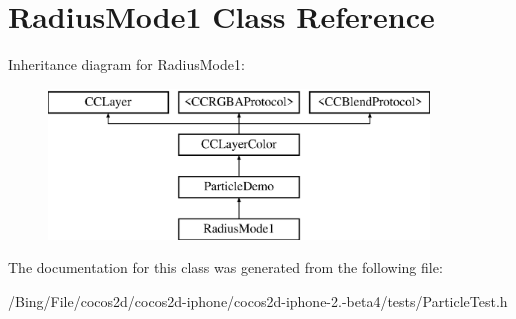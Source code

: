 \hypertarget{interface_radius_mode1}{\section{Radius\-Mode1 Class Reference}
\label{interface_radius_mode1}
}
Inheritance diagram for Radius\-Mode1\-:\begin{figure}[H]
\begin{center}
\leavevmode
\includegraphics[height=4.000000cm]{interface_radius_mode1}
\end{center}
\end{figure}


The documentation for this class was generated from the following file\-:\begin{DoxyCompactItemize}
\item 
/\-Bing/\-File/cocos2d/cocos2d-\/iphone/cocos2d-\/iphone-\/2.-\/beta4/tests/Particle\-Test.\-h\end{DoxyCompactItemize}
